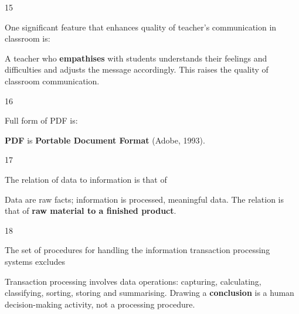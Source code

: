 \begin{question}{15}
{One significant feature that enhances quality of teacher's communication in classroom is:\par}
\begin{explain}
A teacher who \textbf{empathises} with students understands their feelings and difficulties and adjusts the message accordingly. This raises the quality of classroom communication.
\end{explain}
\end{question}

\begin{question}{16}
{Full form of PDF is:\par}
\begin{explain}
\textbf{PDF} is \textbf{Portable Document Format} (Adobe, 1993).
\end{explain}
\end{question}

\begin{question}{17}
{The relation of data to information is that of\par}
\begin{explain}
Data are raw facts; information is processed, meaningful data. The relation is that of \textbf{raw material to a finished product}.
\end{explain}
\end{question}

\begin{question}{18}
{The set of procedures for handling the information transaction processing systems excludes\par}
\begin{explain}
Transaction processing involves data operations: capturing, calculating, classifying, sorting, storing and summarising. Drawing a \textbf{conclusion} is a human decision-making activity, not a processing procedure.
\end{explain}
\end{question}

